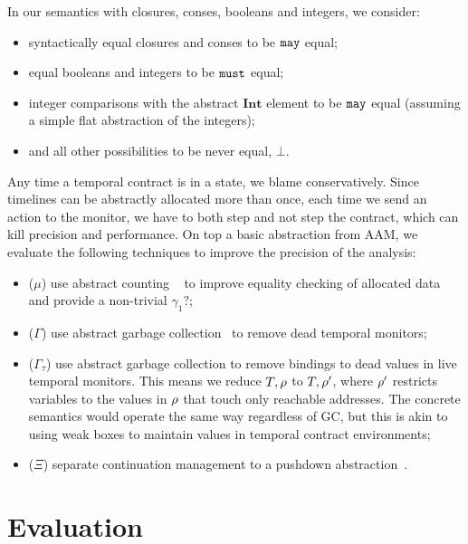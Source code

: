 %
In our semantics with closures, conses, booleans and integers, we consider:
\begin{itemize}
 \item syntactically equal closures and conses to be ${\tt may}$ equal;
 \item equal booleans and integers to be ${\tt must}$ equal;
 \item integer comparisons with the abstract $\mathbf{Int}$ element to be ${\tt may}$ equal (assuming a simple flat abstraction of the integers);
 \item and all other possibilities to be never equal, $\bot$.
\end{itemize}
%
Any time a temporal contract is in a \may{} state, we blame conservatively.
%
Since timelines can be abstractly allocated more than once, each time we send an action to the monitor, we have to both step and not step the contract, which can kill precision and performance.
%
On top a basic abstraction from AAM, we evaluate the following techniques to improve the precision of the analysis:
\begin{itemize}
\item{($\mu$) use abstract counting ~\citep{dvanhorn:Might:2006:GammaCFA} to improve equality checking of allocated data and provide a non-trivial $\gamma_1?$;}
\item{($\Gamma$) use abstract garbage collection~\citep{dvanhorn:Might:2006:GammaCFA} to remove dead temporal monitors;}
\item{($\Gamma_\tau$) use abstract garbage collection to remove bindings to dead values in live temporal monitors.
%
This means we reduce $T,\rho$ to $T,\rho'$, where $\rho'$ restricts variables to the values in $\rho$ that touch only reachable addresses.
%
The concrete semantics would operate the same way regardless of GC, but this is akin to using weak boxes to maintain values in temporal contract environments;}
\item{($\Xi$) separate continuation management to a pushdown abstraction~\citep{dvanhorn:Vardoulakis2011CFA2}.}%
\end{itemize}

\section{Evaluation}\label{sec:evaluation}

